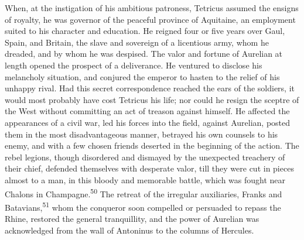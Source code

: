



When, at the instigation of his ambitious patroness, Tetricus
assumed the ensigns of royalty, he was governor of the peaceful
province of Aquitaine, an employment suited to his character and
education. He reigned four or five years over Gaul, Spain, and
Britain, the slave and sovereign of a licentious army, whom he
dreaded, and by whom he was despised. The valor and fortune of
Aurelian at length opened the prospect of a deliverance. He
ventured to disclose his melancholy situation, and conjured the
emperor to hasten to the relief of his unhappy rival. Had this
secret correspondence reached the ears of the soldiers, it would
most probably have cost Tetricus his life; nor could he resign
the sceptre of the West without committing an act of treason
against himself. He affected the appearances of a civil war, led
his forces into the field, against Aurelian, posted them in the
most disadvantageous manner, betrayed his own counsels to his
enemy, and with a few chosen friends deserted in the beginning of
the action. The rebel legions, though disordered and dismayed by
the unexpected treachery of their chief, defended themselves with
desperate valor, till they were cut in pieces almost to a man, in
this bloody and memorable battle, which was fought near Chalons
in Champagne.\textsuperscript{50} The retreat of the irregular auxiliaries, Franks
and Batavians,\textsuperscript{51} whom the conqueror soon compelled or persuaded
to repass the Rhine, restored the general tranquillity, and the
power of Aurelian was acknowledged from the wall of Antoninus to
the columns of Hercules.

